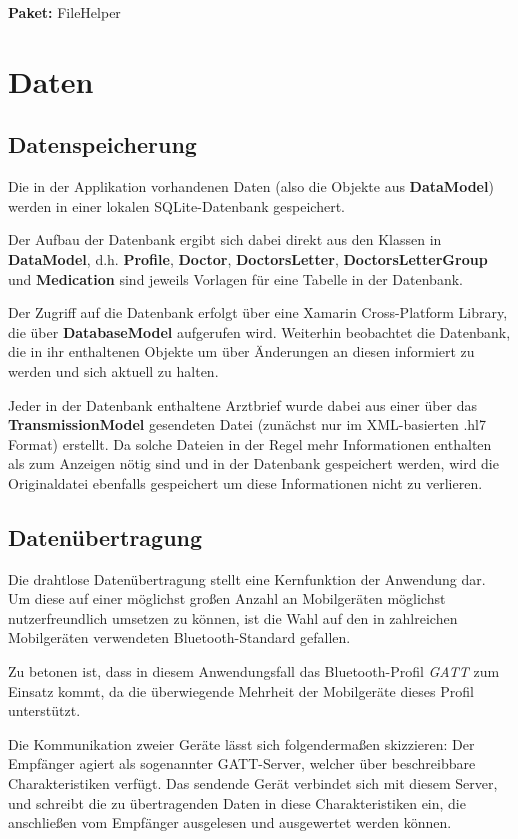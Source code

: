 \documentclass[a4paper]{scrreprt}
\begin{document}
\textbf{Paket:} FileHelper


\chapter{Daten}
\section{Datenspeicherung}
Die in der Applikation vorhandenen Daten (also die Objekte aus \textbf{DataModel}) werden in einer lokalen SQLite-Datenbank gespeichert. 

Der Aufbau der Datenbank ergibt sich dabei direkt aus den Klassen in \textbf{DataModel}, d.h. \textbf{Profile}, \textbf{Doctor}, \textbf{DoctorsLetter}, \textbf{DoctorsLetterGroup} und \textbf{Medication} sind jeweils Vorlagen für eine Tabelle in der Datenbank.

Der Zugriff auf die Datenbank erfolgt über eine Xamarin Cross-Platform Library, die über \textbf{DatabaseModel} aufgerufen wird. Weiterhin beobachtet die Datenbank, die in ihr enthaltenen Objekte um über Änderungen an diesen informiert zu werden und sich aktuell zu halten.

Jeder in der Datenbank enthaltene Arztbrief wurde dabei aus einer über das \textbf{TransmissionModel}
gesendeten Datei (zunächst nur im XML-basierten .hl7 Format) erstellt. Da solche Dateien in der Regel mehr Informationen enthalten als zum Anzeigen nötig sind und in der Datenbank gespeichert werden, wird die Originaldatei ebenfalls gespeichert um diese Informationen nicht zu verlieren.

\section{Datenübertragung}
Die drahtlose Datenübertragung stellt eine Kernfunktion der Anwendung dar. Um diese auf einer möglichst großen Anzahl an Mobilgeräten möglichst nutzerfreundlich umsetzen zu können, ist die Wahl auf den in zahlreichen Mobilgeräten verwendeten Bluetooth-Standard gefallen.

Zu betonen ist, dass in diesem Anwendungsfall das Bluetooth-Profil \textit{GATT} zum Einsatz kommt, da die überwiegende Mehrheit der Mobilgeräte dieses Profil unterstützt.

Die Kommunikation zweier Geräte lässt sich folgendermaßen skizzieren:
Der Empfänger agiert als sogenannter GATT-Server, welcher über beschreibbare Charakteristiken verfügt. Das sendende Gerät verbindet sich mit diesem Server, und schreibt die zu übertragenden Daten in diese Charakteristiken ein, die anschließen vom Empfänger ausgelesen und ausgewertet werden können.
\end{document}
